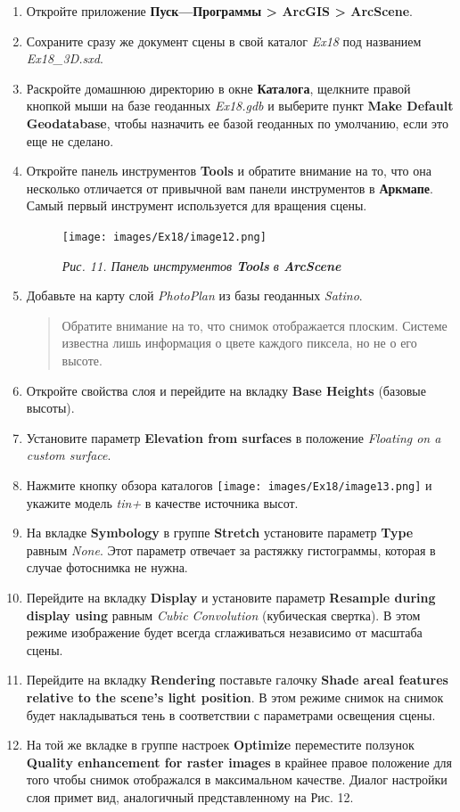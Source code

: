 \documentclass[12pt,]{book}
\begin{document}
\begin{enumerate}
\def\labelenumi{\arabic{enumi}.}
\item
  Откройте приложение \textbf{Пуск---Программы \textgreater{} ArcGIS \textgreater{} ArcScene}.
\item
  Сохраните сразу же документ сцены в свой каталог \emph{Ex18} под названием \emph{Ex18\_3D.sxd}.
\item
  Раскройте домашнюю директорию в окне \textbf{Каталога}, щелкните правой кнопкой мыши на базе геоданных \emph{Ex18.gdb} и выберите пункт \textbf{Make Default Geodatabase}, чтобы назначить ее базой геоданных по умолчанию, если это еще не сделано.
\item
  Откройте панель инструментов \textbf{Tools} и обратите внимание на то, что она несколько отличается от привычной вам панели инструментов в \textbf{Аркмапе}. Самый первый инструмент используется для вращения сцены.

  \begin{figure}
  \centering
  \texttt{[image: images/Ex18/image12.png]}
  \caption{\emph{Рис. 11. Панель инструментов \textbf{Tools} в \textbf{ArcScene} }}
  \end{figure}
\item
  Добавьте на карту слой \emph{PhotoPlan} из базы геоданных \emph{Satino}.

  \begin{quote}
  Обратите внимание на то, что снимок отображается плоским. Системе известна лишь информация о цвете каждого пиксела, но не о его высоте.
  \end{quote}
\item
  Откройте свойства слоя и перейдите на вкладку \textbf{Base Heights} (базовые высоты).
\item
  Установите параметр \textbf{Elevation from surfaces} в положение \emph{Floating on a custom surface}.
\item
  Нажмите кнопку обзора каталогов \texttt{[image: images/Ex18/image13.png]} и укажите модель \emph{tin+} в качестве источника высот.
\item
  На вкладке \textbf{Symbology} в группе \textbf{Stretch} установите параметр \textbf{Type} равным \emph{None}. Этот параметр отвечает за растяжку гистограммы, которая в случае фотоснимка не нужна.
\item
  Перейдите на вкладку \textbf{Display} и установите параметр \textbf{Resample during display using} равным \emph{Cubic Convolution} (кубическая свертка). В этом режиме изображение будет всегда сглаживаться независимо от масштаба сцены.
\item
  Перейдите на вкладку \textbf{Rendering} поставьте галочку \textbf{Shade areal features relative to the scene's light position}. В этом режиме снимок на снимок будет накладываться тень в соответствии с параметрами освещения сцены.
\item
  На той же вкладке в группе настроек \textbf{Optimize} переместите ползунок \textbf{Quality enhancement for raster images} в крайнее правое положение для того чтобы снимок отображался в максимальном качестве. Диалог настройки слоя примет вид, аналогичный представленному на Рис. 12.


\end{enumerate}
\end{document}
